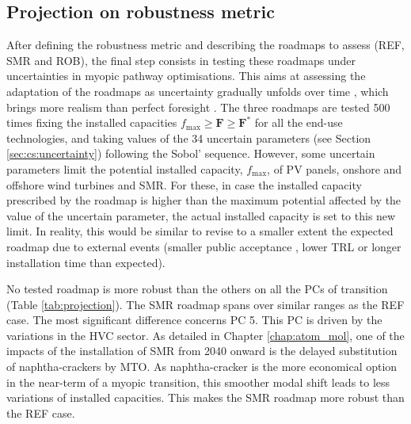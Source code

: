 \subsection{Projection on robustness metric}
\label{subsec:RobPol:Projection}
After defining the robustness metric and describing the roadmaps to assess (\ie REF, SMR and ROB), the final step consists in testing these roadmaps under uncertainties in myopic pathway optimisations. This aims at assessing the adaptation of the roadmaps as uncertainty gradually unfolds over time \cite{moret2020overcapacity}, which brings more realism than perfect foresight \cite{poncelet2016myopic}. The three roadmaps are tested 500 times fixing the installed capacities $f_{\mathrm{max}}\geq\textbf{F}\geq\textbf{F}^*$ for all the end-use technologies, and taking values of the 34 uncertain parameters (see Section \ref{sec:cs:uncertainty}) following the Sobol' sequence. However,  some uncertain parameters limit the potential installed capacity, $f_{\mathrm{max}}$, of \gls{PV} panels, onshore and offshore wind turbines and \gls{SMR}. For these, in case the installed capacity prescribed by the roadmap is higher than the maximum potential affected by the value of the uncertain parameter, the actual installed capacity is set to this new limit. In reality, this would be similar to revise to a smaller extent the expected roadmap due to external events (\eg smaller public acceptance \cite{zoellner2008public,sam2014small}, lower \gls{TRL} or longer installation time than expected).

No tested roadmap is more robust than the others on all the \gls{PCs} of transition (Table \ref{tab:projection}). The SMR roadmap spans over similar ranges as the REF case. The most significant difference concerns PC 5. This PC is driven by the variations in the \gls{HVC} sector. As detailed in Chapter \ref{chap:atom_mol}, one of the impacts of the installation of \gls{SMR} from 2040 onward is the delayed substitution of naphtha-crackers by \gls{MTO}. As naphtha-cracker is the more economical option in the near-term of a myopic transition, this smoother modal shift leads to less variations of installed capacities. This makes the SMR roadmap more robust than the REF case. 


